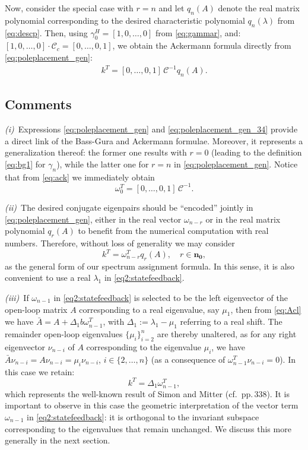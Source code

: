 \documentclass[conference]{IEEEtran}
\newcommand{\acl}{\bar{A}}
\newcommand{\om}{\omega}
\newcommand{\numno}{\boldsymbol{n_0}}
\begin{document}
Now, consider  the special case with $r=n$ and let $q_n(A)$ denote the real matrix polynomial corresponding to the desired characteristic polynomial $q_n(\lambda)$ from \eqref{eq:descp}.
Then, using $\gamma^H_{0} = [1,0,\ldots,0]$ from \eqref{eq:gammar}, and:
$[1,0,\ldots,0]\cdot \mathcal{C}_c = [0,\ldots,0,1]$,
we obtain  the Ackermann formula directly from \eqref{eq:poleplacement_gen}:
\begin{align}
\label{eq:ack}
k^T = [0,\ldots,0,1]\, \mathcal{C}^{-1} q_n(A).
\end{align}

\subsection{Comments}



\emph{(i)}~Expressions \eqref{eq:poleplacement_gen}
and \eqref{eq:poleplacement_gen_34} provide a direct link of the
Bass-Gura and Ackermann formulae. Moreover, it represents a
generalization thereof: the former one results with $r=0$ (leading to the definition \eqref{eq:bg1} for $\gamma_{n}$), while the latter one   for $r=n$ in  \eqref{eq:poleplacement_gen}. Notice that from \eqref{eq:ack} we immediately obtain
\[
\omega_0^T=[0,\ldots,0,1]\, \mathcal{C}^{-1}.
\]




\emph{(ii)}~The desired conjugate eigenpairs should be ``encoded'' jointly in \eqref{eq:poleplacement_gen}, either in the real vector $\omega_{n-r}$ or in the real matrix polynomial $q_r(A)$ to benefit from the numerical computation with real numbers. Therefore, without loss of generality we may consider
\begin{equation}
\label{eq:poleplacement_gen_rer}
k^T = \om_{n-r}^T q_r(A), \quad r\in\numno, \end{equation}
as the general form of our spectrum assignment formula. In this sense, it is also convenient to use a real $\lambda_1$ in
\eqref{eq2:statefeedback}.

\emph{(iii)}~If $\om_{n-1}$ in \eqref{eq2:statefeedback} is selected to be the left eigenvector of the open-loop matrix $A$ corresponding to a real eigenvalue, say $\mu_{1}$, then from \eqref{eq:Acl} we have $\acl = A+\Delta_1 {b \om_{n-1}^T}$, with $\Delta_1:=\lambda_1-\mu_{1}$ referring to a real shift. The remainder open-loop eigenvalues $\{\mu_i\}_{i=2}^n$ are thereby unaltered, as for any right eigenvector $\nu_{n-i}$ of $A$ corresponding to the eigenvalue $\mu_i$, we have $\acl \nu_{n-i} = A \nu_{n-i}=\mu_i \nu_{n-i}$, $i\in\{2,\ldots,n\}$ (as a consequence of $\om_{n-1}^T\nu_{n-i}=0$). In this case we retain:
\[
k^T={\Delta_1}\om_{n-1}^T,
\]
which represents the well-known result of Simon and Mitter
\cite{SimMit68} (cf.~{pp.\,338}). It is important to observe in this
case the geometric interpretation of the vector term $\om_{n-1}$ in
\eqref{eq2:statefeedback}: it is {orthogonal to the invariant
  subspace} corresponding to the {eigenvalues that remain
  unchanged}. We discuss this more generally in the next section.
\end{document}
